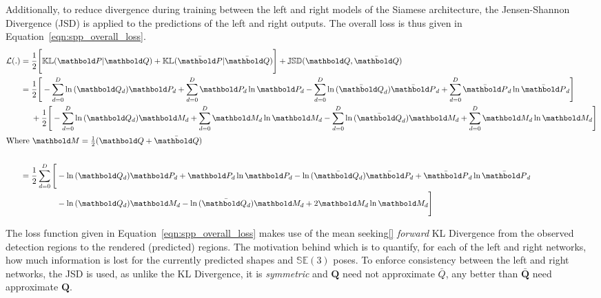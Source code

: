 Additionally, to reduce divergence during training between the left and right models of the Siamese 
architecture, the Jensen-Shannon Divergence (JSD) is applied to the predictions of the left and right outputs.
The overall loss is thus given in Equation~\ref{eqn:spp_overall_loss}.
\begin{align}
  \label{eqn:spp_overall_loss}
  \mathcal{L}(.) &{}= \frac{1}{2} \Bigg[
    \mathbb{KL}(\bm{P} \vert \bm{Q}) + \mathbb{KL}(\bar{\bm{P}} \vert \bar{\bm{Q}})
  \Bigg]
  + \mathbb{JSD}(\bm{Q}, \bar{\bm{Q}})\\
  &{}= 
  \begin{aligned}[t]
    {}& \frac{1}{2} \Bigg[
      -\sum_{d = 0}^{D} \ln{(\bm{Q}_{d})}\bm{P}_{d} + \sum_{d = 0}^{D} \bm{P}_{d}\ln{\bm{P}_{d}}
      -\sum_{d = 0}^{D} \ln{(\bar{\bm{Q}}_{d})}\bar{\bm{P}}_{d} + \sum_{d = 0}^{D} \bar{\bm{P}}_{d}\ln{\bar{\bm{P}}_{d}}
    \Bigg]\\
    {}& + \frac{1}{2} \Bigg[
      -\sum_{d = 0}^{D} \ln{(\bm{Q}_{d})}\bm{M}_{d} + \sum_{d = 0}^{D} \bm{M}_{d}\ln{\bm{M}_{d}}
      -\sum_{d = 0}^{D} \ln{(\bar{\bm{Q}}_{d})}\bm{M}_{d} + \sum_{d = 0}^{D} \bm{M}_{d}\ln{\bm{M}_{d}}
    \Bigg]
  \end{aligned}\\
  \shortintertext{Where \( \bm{M} = \frac{1}{2} (\bm{Q} + \bar{\bm{Q}}) \)}\\
  {}&= \frac{1}{2} \sum_{d = 0}^{D}
    \begin{aligned}[t]
    \Bigg[ {}&
    -\ln{(\bm{Q}_{d})}\bm{P}_{d} + \bm{P}_{d}\ln{\bm{P}_{d}}
    -\ln{(\bar{\bm{Q}_{d}})}\bar{\bm{P}_{d}} + \bar{\bm{P}}_{d}\ln{\bar{\bm{P}}_{d}}\\
    {}& -\ln{(\bm{Q}_{d})}\bm{M}_{d} -\ln{(\bar{\bm{Q}_{d}})}\bm{M}_{d} + 2\bm{M}_{d}\ln{\bm{M}_{d}}
    \Bigg]
    \end{aligned}
\end{align}

The loss function given in Equation~\ref{eqn:spp_overall_loss} makes use of the mean seeking\ref{} 
\textit{forward} KL Divergence from the observed detection regions to the rendered (predicted) 
regions. The motivation behind which is to quantify, for each of the left and right networks, how 
much information is lost for the currently predicted shapes and \( \mathbb{SE}(3) \) poses. To 
enforce consistency between the left and right networks, the JSD is used, as unlike the KL Divergence, 
it is \textit{symmetric} and \( \bm{Q} \) need not approximate \( \bar{Q} \), any better than 
\( \bar{\bm{Q}} \) need approximate \( \bm{Q} \).

